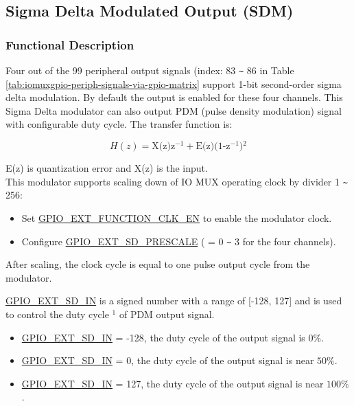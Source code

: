 \documentclass[main\_\_EN.tex]{subfiles}
\begin{document}
\subsection{Sigma Delta Modulated Output (SDM)}

\subsubsection{Functional Description}

Four out of the 99 peripheral output signals (index: 83 \verb+~+ 86 in Table \ref{tab:iomuxgpio-periph-signals-via-gpio-matrix} support 1-bit second-order sigma delta modulation. By default the output is enabled for these four channels. This Sigma Delta modulator can also output PDM (pulse density modulation) signal with configurable duty cycle. The transfer function is:

\[
    H(z)=\textrm{X(z)z$^{-1}$} + \textrm{E(z)(1-z$^{-1}$)$^{2}$}
    \]

E(z) is quantization error and X(z) is the input.\\
This modulator supports scaling down of IO MUX operating clock by divider 1 \verb+~+ 256:

\begin{itemize}
    \item Set  \hyperref[fielddesc:GPIOSDFUNCTIONCLKEN]{GPIO\_EXT\_FUNCTION\_CLK\_EN} to enable the modulator clock.
    \item Configure \hyperref[fielddesc:GPIOSDSD0PRESCALE]{GPIO\_EXT\_SD\_PRESCALE} ( = 0 \verb+~+ 3 for the four channels).
\end{itemize}

After scaling, the clock cycle is equal to one pulse output cycle from the modulator.

\hyperref[fielddesc:GPIOSDSD0IN]{GPIO\_EXT\_SD\_IN} is a signed number with a range of [-128, 127] and is used to control the duty cycle $^{1}$ of PDM output signal.

\begin{itemize}
    \item \hyperref[fielddesc:GPIOSDSD0IN]{GPIO\_EXT\_SD\_IN} = -128, the duty cycle of the output signal is \begin{math}0\% \end{math}.
    \item \hyperref[fielddesc:GPIOSDSD0IN]{GPIO\_EXT\_SD\_IN} = 0, the duty cycle of the output signal is near \begin{math}50\% \end{math}.
    \item \hyperref[fielddesc:GPIOSDSD0IN]{GPIO\_EXT\_SD\_IN} = 127, the duty cycle of the output signal is near \begin{math}100\% \end{math}.
\end{itemize}
\end{document}
